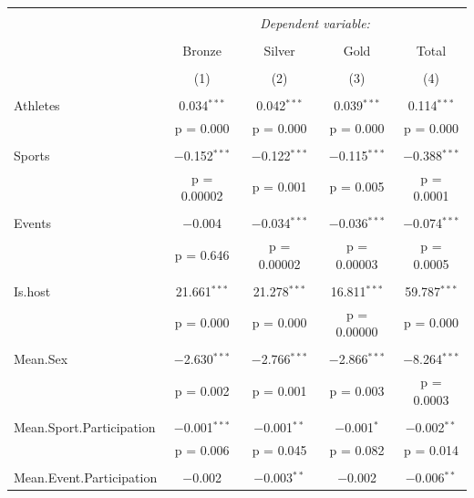 \documentclass{mcmthesis}
\begin{document}
\begin{table}[!htbp] \centering 
  \caption{} 
  \label{} 
\begin{tabular}{@{\extracolsep{5pt}}lcccc} 
\\[-1.8ex]\hline 
\hline \\[-1.8ex] 
 & \multicolumn{4}{c}{\textit{Dependent variable:}} \\ 
\cline{2-5} 
\\[-1.8ex] & Bronze & Silver & Gold & Total \\ 
\\[-1.8ex] & (1) & (2) & (3) & (4)\\ 
\hline \\[-1.8ex] 
 Athletes & 0.034$^{***}$ & 0.042$^{***}$ & 0.039$^{***}$ & 0.114$^{***}$ \\ 
  & p = 0.000 & p = 0.000 & p = 0.000 & p = 0.000 \\ 
  & & & & \\ 
 Sports & $-$0.152$^{***}$ & $-$0.122$^{***}$ & $-$0.115$^{***}$ & $-$0.388$^{***}$ \\ 
  & p = 0.00002 & p = 0.001 & p = 0.005 & p = 0.0001 \\ 
  & & & & \\ 
 Events & $-$0.004 & $-$0.034$^{***}$ & $-$0.036$^{***}$ & $-$0.074$^{***}$ \\ 
  & p = 0.646 & p = 0.00002 & p = 0.00003 & p = 0.0005 \\ 
  & & & & \\ 
 Is.host & 21.661$^{***}$ & 21.278$^{***}$ & 16.811$^{***}$ & 59.787$^{***}$ \\ 
  & p = 0.000 & p = 0.000 & p = 0.00000 & p = 0.000 \\ 
  & & & & \\ 
 Mean.Sex & $-$2.630$^{***}$ & $-$2.766$^{***}$ & $-$2.866$^{***}$ & $-$8.264$^{***}$ \\ 
  & p = 0.002 & p = 0.001 & p = 0.003 & p = 0.0003 \\ 
  & & & & \\ 
 Mean.Sport.Participation & $-$0.001$^{***}$ & $-$0.001$^{**}$ & $-$0.001$^{*}$ & $-$0.002$^{**}$ \\ 
  & p = 0.006 & p = 0.045 & p = 0.082 & p = 0.014 \\ 
  & & & & \\ 
 Mean.Event.Participation & $-$0.002 & $-$0.003$^{**}$ & $-$0.002 & $-$0.006$^{**}$ \\ 

\end{tabular}
\end{table}
\end{document}
